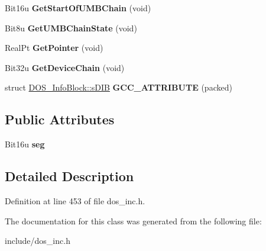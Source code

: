 \begin{DoxyCompactItemize}
\item 
\hypertarget{classDOS__InfoBlock_adb819f949bb84a57ec47b3eadcf8394b}{Bit16u {\bfseries Get\-Start\-Of\-U\-M\-B\-Chain} (void)}\label{classDOS__InfoBlock_adb819f949bb84a57ec47b3eadcf8394b}

\item 
\hypertarget{classDOS__InfoBlock_a77f19be942b10a316e54464547cfb2e2}{Bit8u {\bfseries Get\-U\-M\-B\-Chain\-State} (void)}\label{classDOS__InfoBlock_a77f19be942b10a316e54464547cfb2e2}

\item 
\hypertarget{classDOS__InfoBlock_a872b7fd95a7af22e303971abffc41e86}{Real\-Pt {\bfseries Get\-Pointer} (void)}\label{classDOS__InfoBlock_a872b7fd95a7af22e303971abffc41e86}

\item 
\hypertarget{classDOS__InfoBlock_a79370f3f9f5a228c2b584b330b912dcc}{Bit32u {\bfseries Get\-Device\-Chain} (void)}\label{classDOS__InfoBlock_a79370f3f9f5a228c2b584b330b912dcc}

\item 
\hypertarget{classDOS__InfoBlock_a492f63514c4bc0a876008bd5dffbefb4}{struct \hyperlink{structDOS__InfoBlock_1_1sDIB}{D\-O\-S\-\_\-\-Info\-Block\-::s\-D\-I\-B} {\bfseries G\-C\-C\-\_\-\-A\-T\-T\-R\-I\-B\-U\-T\-E} (packed)}\label{classDOS__InfoBlock_a492f63514c4bc0a876008bd5dffbefb4}

\end{DoxyCompactItemize}
\subsection*{Public Attributes}
\begin{DoxyCompactItemize}
\item 
\hypertarget{classDOS__InfoBlock_ae1079089060526859c4394a55d3153ee}{Bit16u {\bfseries seg}}\label{classDOS__InfoBlock_ae1079089060526859c4394a55d3153ee}

\end{DoxyCompactItemize}


\subsection{Detailed Description}


Definition at line 453 of file dos\-\_\-inc.\-h.



The documentation for this class was generated from the following file\-:\begin{DoxyCompactItemize}
\item 
include/dos\-\_\-inc.\-h\end{DoxyCompactItemize}
